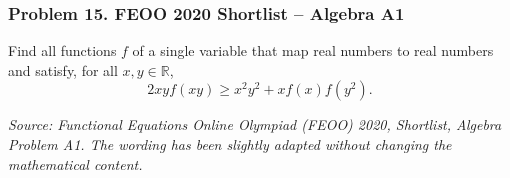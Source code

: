 \subsubsection*{Problem 15. FEOO 2020 Shortlist -- Algebra A1}

\begin{exercisebox}[medium]

Find all functions $f$ of a single variable that
map real numbers to real numbers and satisfy,
for all $x,y\in\mathbb R$,
\[
2xyf(xy)\geq x^2y^2+xf(x)f(y^2).
\]

\medskip
\noindent
\textit{Source: Functional Equations Online Olympiad
(FEOO) 2020, Shortlist, Algebra Problem A1.
The wording has been slightly adapted without
changing the mathematical content.}


\end{exercisebox}